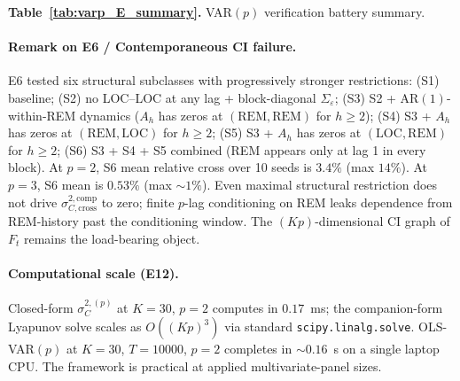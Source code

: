 \documentclass[11pt,letterpaper]{article}
\theoremstyle{remark}
\newcommand{\REM}{\mathrm{REM}}
\newcommand{\LOC}{\mathrm{LOC}}
\newcommand{\Sigmae}{\Sigma_\varepsilon}
\begin{document}
\smallskip
\noindent{}\label{tab:varp_E_summary}\textbf{Table~\ref{tab:varp_E_summary}.} VAR$(p)$ verification battery summary.
\smallskip

\paragraph{Remark on E6 / Contemporaneous CI failure.} E6 tested six structural subclasses with progressively stronger restrictions: (S1) baseline; (S2) no LOC--LOC at any lag + block-diagonal $\Sigmae$; (S3) S2 + AR$(1)$-within-REM dynamics ($A_h$ has zeros at $(\REM, \REM)$ for $h \ge 2$); (S4) S3 + $A_h$ has zeros at $(\REM, \LOC)$ for $h \ge 2$; (S5) S3 + $A_h$ has zeros at $(\LOC, \REM)$ for $h \ge 2$; (S6) S3 + S4 + S5 combined (REM appears only at lag 1 in every block). At $p = 2$, S6 mean relative cross over 10 seeds is $3.4\%$ (max $14\%$). At $p = 3$, S6 mean is $0.53\%$ (max $\sim 1\%$). Even maximal structural restriction does not drive $\sigma^{2,\text{comp}}_{C, \mathrm{cross}}$ to zero; finite $p$-lag conditioning on REM leaks dependence from REM-history past the conditioning window. The $(Kp)$-dimensional CI graph of $F_t$ remains the load-bearing object.

\paragraph{Computational scale (E12).} Closed-form $\sigma^{2,(p)}_C$ at $K = 30$, $p = 2$ computes in $0.17$~ms; the companion-form Lyapunov solve scales as $O((Kp)^3)$ via standard \texttt{scipy.linalg.solve}. OLS-VAR$(p)$ at $K = 30$, $T = 10000$, $p = 2$ completes in $\sim 0.16$~s on a single laptop CPU. The framework is practical at applied multivariate-panel sizes.
\end{document}
